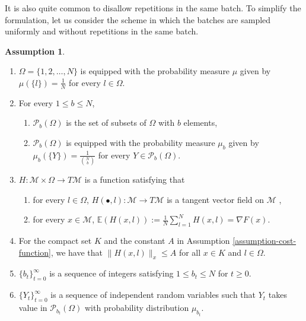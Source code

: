 \documentclass{amsart}
\newcommand{\E}{\mathbb{E}}
\newcommand{\bn}[2]{\genfrac{(}{)}{0pt}{}{#1}{#2}}
\newcommand{\M}{\mathcal{M}}
\newcommand{\p}{\mathcal{P}}
\theoremstyle{plain}
\theoremstyle{definition}
\newtheorem{assumption}[theorem]{Assumption}
\theoremstyle{remark}
\numberwithin{theorem}{section}
\numberwithin{equation}{section}
\begin{document}
It is also quite common to disallow repetitions in the same batch. To simplify the formulation, let us consider the scheme in which the batches are sampled uniformly and without repetitions in the same batch.

\begin{assumption}\label{assumption-batch-no-repetitions}
\begin{enumerate}
	\item $\Omega =\{1, 2, \dots, N\}$ is equipped with the probability measure $\mu$ given by $\mu(\{l\})=\frac{1}{N}$ for every $l \in \Omega$.
	\item For every $1\leq b\leq N$,
	\begin{enumerate}
		\item $\p_b(\Omega)$ is the set of subsets of $\Omega$ with $b$ elements,
		\item $\p_b(\Omega)$ is equipped with the probability measure $\mu_b$ given by $\mu_b(\{Y\})=\frac{1}{\bn{N}{b}}$ for every $Y \in \p_b(\Omega)$.
	\end{enumerate}
	\item $H:\M \times \Omega \rightarrow T\M$ is a function satisfying that
	\begin{enumerate}
		\item for every $l \in \Omega$, $H(\bullet, l): \M\rightarrow T\M$ is a tangent vector field on $\M$ ,
		\item for every $x \in \M$, $\E(H(x, l)) :=\frac{1}{N} \sum_{l=1}^N H(x, l) = \nabla F(x)$.
	\end{enumerate}
	\item For the compact set $K$ and the constant $A$ in Assumption \ref{assumption-cost-function}, we have that $\| H(x,l)\|_x \leq A$ for all $x \in K$ and $l \in \Omega$.
	\item $\{b_t\}_{t=0}^\infty$ is a sequence of  integers satisfying $1\leq b_t \leq N$ for $t\geq 0$.
  \item $\{Y_t\}_{t=0}^\infty$ is a sequence of independent random variables such that $Y_t$ takes value in $\p_{b_t}(\Omega)$ with probability distribution $\mu_{b_t}$.
\end{enumerate}
\end{assumption}
\end{document}
